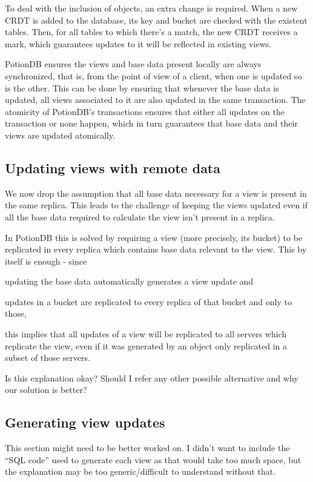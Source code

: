 \documentclass{vldb}
\newcommand{\grumbler}[2]{{\color{red}{\bf #1:} #2}}
\newcommand{\andre}[1]{\grumbler{andre}{#1}}
\begin{document}
To deal with the inclusion of objects, an extra change is required.
When a new CRDT is added to the database, its key and bucket are checked with the existent tables.
Then, for all tables to which there's a match, the new CRDT receives a mark, which guarantees updates to it will be reflected in existing views.

PotionDB ensures the views and base data present locally are always synchronized, that is, from the point of view of a client, when one is updated so is the other.
This can be done by ensuring that whenever the base data is updated, all views associated to it are also updated in the same transaction.
The atomicity of PotionDB's transactions ensures that either all updates on the transaction or none happen, which in turn guarantees that base data and their views are updated atomically.

\subsection{Updating views with remote data}

We now drop the assumption that all base data necessary for a view is present in the same replica.
This leads to the challenge of keeping the views updated even if all the base data required to calculate the view isn't present in a replica.

In PotionDB this is solved by requiring a view (more precisely, its bucket) to be replicated in every replica which contains base data relevant to the view.
This by itself is enough - since 
\begin{enumerate*}[label=(\roman*)]
\item updating the base data automatically generates a view update and
\item updates in a bucket are replicated to every replica of that bucket and only to those,
\end{enumerate*}
this implies that all updates of a view will be replicated to all servers which replicate the view, even if it was generated by an object only replicated in a subset of those servers.

\andre{Is this explanation okay? Should I refer any other possible alternative and why our solution is better?}

\subsection{Generating view updates}

\andre{This section might need to be better worked on. I didn't want to include the ``SQL code'' used to generate each view as that would take too much space, but the explanation may be too generic/difficult to understand without that.}
\end{document}
